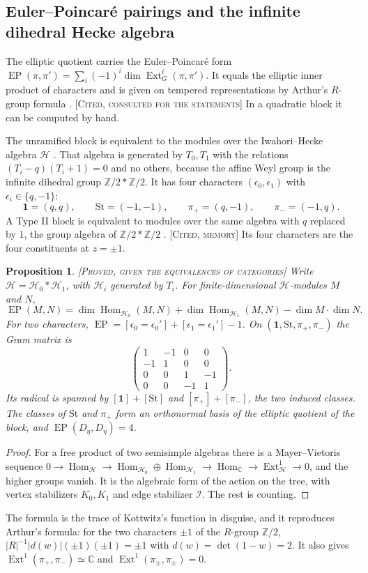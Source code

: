 \documentclass[12pt,letterpaper]{amsart}
\numberwithin{equation}{section}
\newtheorem{proposition}[theorem]{Proposition}
\theoremstyle{definition}
\theoremstyle{remark}
\newcommand{\St}{\mathrm{St}}
\newcommand{\triv}{\mathbf 1}
\newcommand{\EP}{\operatorname{EP}}
\newcommand{\Hom}{\operatorname{Hom}}
\newcommand{\Ext}{\operatorname{Ext}}
\newcommand{\status}[1]{\textup{[\textsc{#1}]}}
\begin{document}
\subsection{Euler--Poincar\'e pairings and the infinite dihedral Hecke algebra}\label{sub:EP}
The elliptic quotient carries the Euler--Poincar\'e form $\EP(\pi,\pi')=\sum_i(-1)^i\dim\Ext^i_G(\pi,\pi')$. It equals the elliptic inner product of characters \cite{Ka86,SS97} and is given on tempered representations by Arthur's $R$-group formula \cite{Ar93,OS13}. \status{Cited, consulted for the statements} In a quadratic block it can be computed by hand.

The unramified block is equivalent to the modules over the Iwahori--Hecke algebra $\mathcal H$ \cite{Bo76}. That algebra is generated by $T_0,T_1$ with the relations $(T_i-q)(T_i+1)=0$ and no others, because the affine Weyl group is the infinite dihedral group $\mathbb Z/2*\mathbb Z/2$. It has four characters $(\epsilon_0,\epsilon_1)$ with $\epsilon_i\in\{q,-1\}$:
\[
\triv=(q,q),\qquad\St=(-1,-1),\qquad\pi_+=(q,-1),\qquad\pi_-=(-1,q).
\]
A Type II block is equivalent to modules over the same algebra with $q$ replaced by $1$, the group algebra of $\mathbb Z/2*\mathbb Z/2$ \cite{Ro98}. \status{Cited, memory} Its four characters are the four constituents at $z=\pm1$.

\begin{proposition}\label{prop:EP}\status{Proved, given the equivalences of categories}
Write $\mathcal H=\mathcal H_0*\mathcal H_1$, with $\mathcal H_i$ generated by $T_i$. For finite-dimensional $\mathcal H$-modules $M$ and $N$,
\[
\EP(M,N)=\dim\Hom_{\mathcal H_0}(M,N)+\dim\Hom_{\mathcal H_1}(M,N)-\dim M\cdot\dim N .
\]
For two characters, $\EP=[\epsilon_0=\epsilon_0']+[\epsilon_1=\epsilon_1']-1$. On $(\triv,\St,\pi_+,\pi_-)$ the Gram matrix is
\[
\begin{pmatrix}1&-1&0&0\\-1&1&0&0\\0&0&1&-1\\0&0&-1&1\end{pmatrix}.
\]
Its radical is spanned by $[\triv]+[\St]$ and $[\pi_+]+[\pi_-]$, the two induced classes. The classes of $\St$ and $\pi_+$ form an orthonormal basis of the elliptic quotient of the block, and $\EP(D_\eta,D_\eta)=4$.
\end{proposition}
\begin{proof}
For a free product of two semisimple algebras there is a Mayer--Vietoris sequence $0\to\Hom_{\mathcal H}\to\Hom_{\mathcal H_0}\oplus\Hom_{\mathcal H_1}\to\Hom_{\mathbb C}\to\Ext^1_{\mathcal H}\to0$, and the higher groups vanish. It is the algebraic form of the action on the tree, with vertex stabilizers $K_0,K_1$ and edge stabilizer $\mathcal I$. The rest is counting.
\end{proof}
The formula is the trace of Kottwitz's function in disguise, and it reproduces Arthur's formula: for the two characters $\pm1$ of the $R$-group $\mathbb Z/2$, $|R|^{-1}|d(w)|(\pm1)(\pm1)=\pm1$ with $d(w)=\det(1-w)=2$. It also gives $\Ext^1(\pi_+,\pi_-)\simeq\mathbb C$ and $\Ext^1(\pi_\pm,\pi_\pm)=0$.
\end{document}
